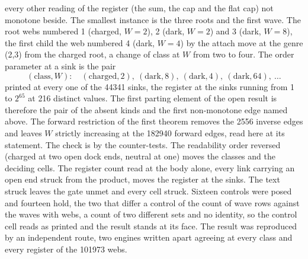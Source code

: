 \begin{chproof}[census]
every other reading of the register (the sum, the cap and the flat cap) not monotone beside. The smallest instance is the three roots and the first wave. The root webs numbered 1 (charged, $W = 2$), 2 (dark, $W = 2$) and 3 (dark, $W = 8$), the first child the web numbered 4 (dark, $W = 4$) by the attach move at the genre (2,3) from the charged root, a change of class at $W$ from two to four. The order parameter at a sink is the pair
\begin{equation}
(\text{class}, W): \quad (\text{charged}, 2), \ (\text{dark}, 8), \ (\text{dark}, 4), \ (\text{dark}, 64), \ \ldots
\end{equation}
printed at every one of the 44341 sinks, the register at the sinks running from 1 to $2^{65}$ at 216 distinct values. The first parting element of the open result is therefore the pair of the absent kinds and the first non-monotone edge named above. The forward restriction of the first theorem removes the 2556 inverse edges and leaves $W$ strictly increasing at the 182940 forward edges, read here at its statement.
The check is by the counter-tests. The readability order reversed (charged at two open dock ends, neutral at one) moves the classes and the deciding cells. The register count read at the body alone, every link carrying an open end struck from the product, moves the register at the sinks. The text struck leaves the gate unmet and every cell struck. Sixteen controls were posed and fourteen hold, the two that differ a control of the count of wave rows against the waves with webs, a count of two different sets and no identity, so the control cell reads as printed and the result stands at its face.
The result was reproduced by an independent route, two engines written apart agreeing at every class and every register of the 101973 webs.
\end{chproof}

\par\medskip{}\label{narr:close:11-4}\par
